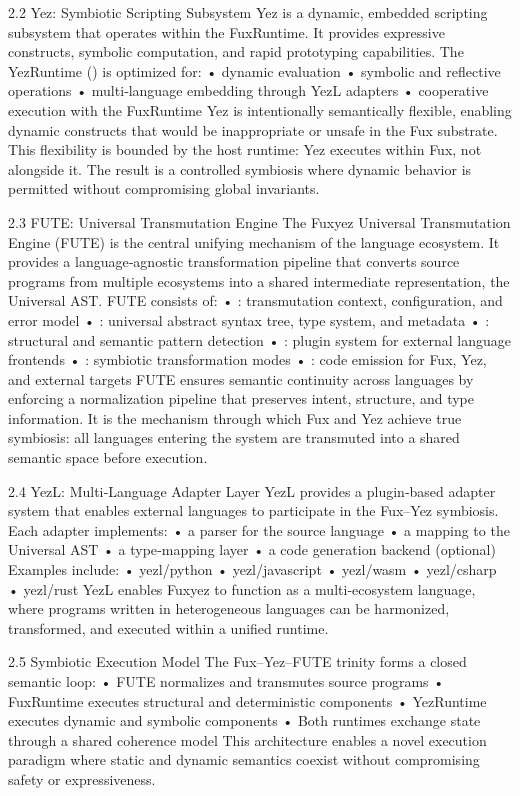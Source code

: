 2.2 Yez: Symbiotic Scripting Subsystem
Yez is a dynamic, embedded scripting subsystem that operates within the FuxRuntime. It provides expressive constructs, symbolic computation, and rapid prototyping capabilities. The YezRuntime () is optimized for:
• 	dynamic evaluation
• 	symbolic and reflective operations
• 	multi‑language embedding through YezL adapters
• 	cooperative execution with the FuxRuntime
Yez is intentionally semantically flexible, enabling dynamic constructs that would be inappropriate or unsafe in the Fux substrate. This flexibility is bounded by the host runtime: Yez executes within Fux, not alongside it. The result is a controlled symbiosis where dynamic behavior is permitted without compromising global invariants.

2.3 FUTE: Universal Transmutation Engine
The Fuxyez Universal Transmutation Engine (FUTE) is the central unifying mechanism of the language ecosystem. It provides a language‑agnostic transformation pipeline that converts source programs from multiple ecosystems into a shared intermediate representation, the Universal AST. FUTE consists of:
• 	: transmutation context, configuration, and error model
• 	: universal abstract syntax tree, type system, and metadata
• 	: structural and semantic pattern detection
• 	: plugin system for external language frontends
• 	: symbiotic transformation modes
• 	: code emission for Fux, Yez, and external targets
FUTE ensures semantic continuity across languages by enforcing a normalization pipeline that preserves intent, structure, and type information. It is the mechanism through which Fux and Yez achieve true symbiosis: all languages entering the system are transmuted into a shared semantic space before execution.

2.4 YezL: Multi‑Language Adapter Layer
YezL provides a plugin‑based adapter system that enables external languages to participate in the Fux–Yez symbiosis. Each adapter implements:
• 	a parser for the source language
• 	a mapping to the Universal AST
• 	a type‑mapping layer
• 	a code generation backend (optional)
Examples include:
• 	yezl/python
• 	yezl/javascript
• 	yezl/wasm
• 	yezl/csharp
• 	yezl/rust
YezL enables Fuxyez to function as a multi‑ecosystem language, where programs written in heterogeneous languages can be harmonized, transformed, and executed within a unified runtime.

2.5 Symbiotic Execution Model
The Fux–Yez–FUTE trinity forms a closed semantic loop:
• 	FUTE normalizes and transmutes source programs
• 	FuxRuntime executes structural and deterministic components
• 	YezRuntime executes dynamic and symbolic components
• 	Both runtimes exchange state through a shared coherence model
This architecture enables a novel execution paradigm where static and dynamic semantics coexist without compromising safety or expressiveness.

